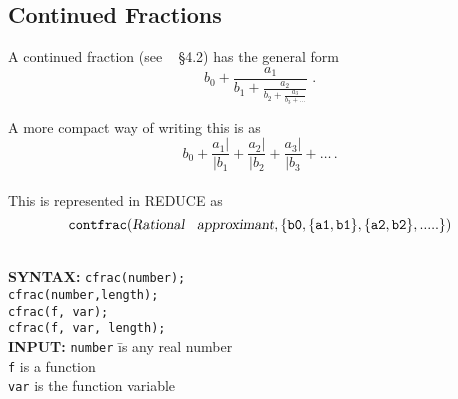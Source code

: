 \subsection{Continued Fractions}

A continued fraction (see ~\cite{PA} \S 4.2) has the general form
{\Large
\[b_0 + \frac{a_1}{b_1 +
         \frac{a_2}{b_2+
          \frac{a_3}{b_3 + \ldots
        }}}
\;.\]
}

A more compact way of writing this is as
\[b_0 + \frac{a_1|}{|b_1} + \frac{a_2|}{|b_2} + \frac{a_3|}{|b_3} + \ldots\,.\]
\\
%
This is represented in {\small REDUCE} as
\[{\tt
   contfrac(\text{\sl Rational\hspace{2mm} approximant},
                \{b0, \{a1,b1\}, \{a2,b2\},.....\})
}\]

\hypertarget{CONTFRAC:operator}{}
\hypertarget{CFRAC:operator}{}
\begin{tabbing}
\\
\textbf{SYNTAX:} \hspace{5mm} 
\= \texttt{cfrac(number);}\\
\> \texttt{cfrac(number,length);}\\
\> \texttt{cfrac(f, var);}\\
\> \texttt{cfrac(f, var, length);}\\[\baselineskip]

\textbf{INPUT:}
\> \texttt{number} \hspace{3mm} \= is any real number\\
\> \texttt{f}                   \> is a function\\
\> \texttt{var}                 \> is the function variable\\
\end{tabbing}

